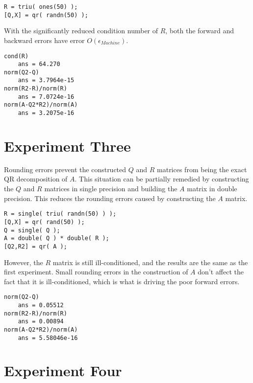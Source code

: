 \documentclass{article}
\begin{document}
\begin{framed}
\begin{verbatim}
R = triu( ones(50) );
[Q,X] = qr( randn(50) );
\end{verbatim}
\end{framed}

With the significantly reduced condition number of \(R\), both the forward and backward errors have error \( O\left(\epsilon_{Machine}\right) \).

\begin{framed}
\begin{verbatim}
cond(R)
    ans = 64.270
norm(Q2-Q)
    ans = 3.7964e-15
norm(R2-R)/norm(R)
    ans = 7.0724e-16
norm(A-Q2*R2)/norm(A)
    ans = 3.2075e-16
\end{verbatim}
\end{framed}

\section{Experiment Three}\label{m3}

Rounding errors prevent the constructed \(Q\) and \(R\) matrices from being the exact QR decomposition of \(A\). This situation can be partially remedied by constructing the \(Q\) and \(R\) matrices in single precision and building the \(A\) matrix in double precision. This reduces the rounding errors caused by constructing the \(A\) matrix.

\begin{framed}
\begin{verbatim}
R = single( triu( randn(50) ) );
[Q,X] = qr( rand(50) );
Q = single( Q );
A = double( Q ) * double( R );
[Q2,R2] = qr( A );
\end{verbatim}
\end{framed}

However, the \(R\) matrix is still ill-conditioned, and the results are the same as the first experiment. Small rounding errors in the construction of \(A\) don't affect the fact that it is ill-conditioned, which is what is driving the poor forward errors.

\begin{framed}
\begin{verbatim}
norm(Q2-Q)
    ans = 0.05512
norm(R2-R)/norm(R)
    ans = 0.00894
norm(A-Q2*R2)/norm(A)
    ans = 5.58046e-16
\end{verbatim}
\end{framed}

\section{Experiment Four}\label{m4}
\end{document}
